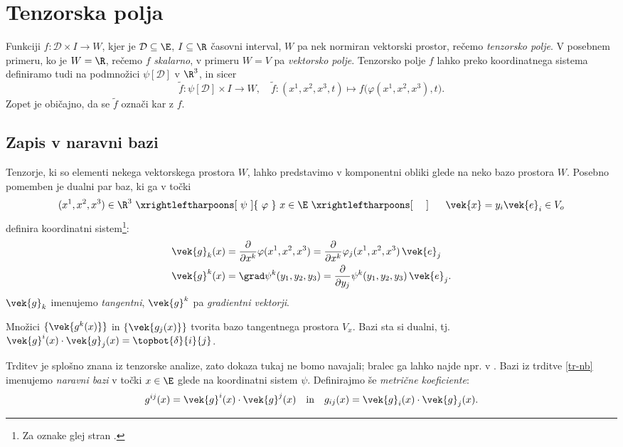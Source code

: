 \section{Tenzorska polja}

Funkciji $f\colon\mathcal{D}\times I\rightarrow W$, kjer je $\mathcal{D}\subseteq\E$, $I\subseteq\R$ časovni
interval, $W$ pa nek normiran vektorski prostor, rečemo \emph{tenzorsko polje}. V posebnem primeru, ko je $W=\R$,
rečemo $f$ \emph{skalarno}, v primeru $W=V$ pa \emph{vektorsko polje}. Tenzorsko polje $f$ lahko
preko koordinatnega sistema definiramo tudi na podmnožici $\psi[\mathcal{D}]$ v $\R^3$, in sicer 
\begin{equation*}
	\tilde{f}\colon\psi[\mathcal{D}]\times I\rightarrow W, \quad
	\tilde{f}\colon(x^1,x^2,x^3,t)\mapsto f\big(\varphi(x^1,x^2,x^3),t\big).
\end{equation*}
Zopet je običajno, da se $\tilde{f}$ označi kar z $f$.

\subsection{Zapis v naravni bazi}

Tenzorje, ki so elementi nekega vektorskega prostora $W$, lahko predstavimo v komponentni obliki
glede na neko bazo prostora $W$. Posebno pomemben je dualni par baz, ki ga v točki
\[
	(x^1,x^2,x^3)\in \R^3\ \xrightleftharpoons[\ \psi\ ]{\ \varphi\ }\ 
	x\in\E\ \xrightleftharpoons[\ \phantom{\varphi}\ ]{\ \phantom{\psi}\ }\ 
	\vek{x}=y_i\vek{e}_i \in V_o
\]
definira koordinatni sistem\footnote{Za oznake glej stran \pageref{ks}.}:
\begin{align*}
	\vek{g}_k(x)&=\frac{\partial}{\partial x^k}\varphi(x^1,x^2,x^3)=
	\frac{\partial}{\partial x^k}\varphi_j(x^1,x^2,x^3)\,\vek{e}_j \\
	\vek{g}^k(x)&=\grad \psi^k(y_1,y_2,y_3)=
	\frac{\partial}{\partial y_j}\psi^k(y_1,y_2,y_3)\,\vek{e}_j.
\end{align*}
$\vek{g}_k$ imenujemo \emph{tangentni}, $\vek{g}^k$ pa \emph{gradientni vektorji}.
\begin{trditev}\label{tr-nb}
	Množici $\{\vek{g^k(x)}\}$ in $\{\vek{g_j(x)}\}$ tvorita bazo tangentnega prostora $V_x$.
	Bazi sta si dualni, tj. $\vek{g}^i(x)\cdot\vek{g}_j(x)=\topbot{\delta}{i}{j}$.
\end{trditev}
Trditev je splošno znana iz tenzorske analize, zato dokaza tukaj ne bomo navajali; bralec ga lahko
najde npr. v \cite[str.~273]{liu}. Bazi iz trditve \ref{tr-nb} imenujemo \emph{naravni bazi} v točki
$x\in\E$ glede na koordinatni sistem $\psi$. Definirajmo še \emph{metrične koeficiente}:
\begin{equation*}
	g^{ij}(x)=\vek{g}^i(x)\cdot\vek{g}^j(x) \quad\mathrm{in}\quad g_{ij}(x)=\vek{g}_i(x)\cdot\vek{g}_j(x).
\end{equation*}


